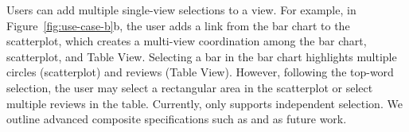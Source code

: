
Users can add multiple single-view selections to a view. For example, in Figure~\ref{fig:use-case-b}b, the user adds a link from the bar chart to the scatterplot, which creates a multi-view coordination among the bar chart, scatterplot, and Table View.
Selecting a bar in the bar chart highlights multiple circles (scatterplot) and reviews (Table View). However, following the top-word selection, the user may select a rectangular area in the scatterplot or select multiple reviews in the table. Currently, \system only supports independent selection. We outline advanced composite specifications such as  and  as future work.


